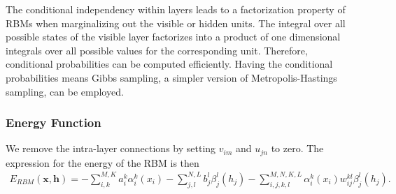 \documentclass[twoside,english]{uiofysmaster}
\begin{document}
The conditional independency within layers leads to a factorization property of RBMs when marginalizing out the visible or hidden units. The integral over all possible states of the visible layer factorizes into a product of one
dimensional integrals over all possible values for the corresponding unit. Therefore, conditional probabilities can be computed efficiently. Having the conditional probabilities means Gibbs sampling, a simpler version of Metropolis-Hastings sampling, can be employed. 

\subsubsection{Energy Function}

We remove the intra-layer connections by setting $v_{im}$ and $u_{jn}$ to zero. The expression for the energy of the RBM is then
\begin{align}
	E_{RBM}(\bm{x}, \bm{h}) = - \sum_{i, k}^{M, K} a_i^k \alpha_i^k (x_i)
	- \sum_{j, l}^{N, L} b_j^l \beta_j^l (h_j) 
	- \sum_{i,j,k,l}^{M,N,K,L} \alpha_i^k (x_i) w_{ij}^{kl} \beta_j^l (h_j). \label{eq:RBMenergy}
\end{align}

\end{document}
